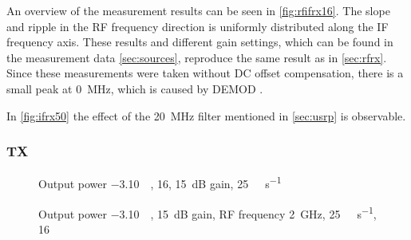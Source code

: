 \documentclass[12pt,a4paper,parskip=full,abstracton]{scrartcl}
\begin{document}
An overview of the measurement results can be seen in \cref{fig:rfifrx16}. The slope and ripple
in the RF frequency direction is uniformly distributed along the IF frequency axis.
These results and different gain settings, which can be found in the measurement data \ref{sec:sources},
reproduce the same result as in \cref{sec:rfrx}. Since these measurements were taken without DC offset
compensation, there is a small peak at \SI{0}{\mega\hertz}, which is caused by DEMOD \cite{demod}.

In \ref{fig:ifrx50} the effect of the \SI{20}{\mega\hertz} filter mentioned in \cref{sec:usrp} is
observable.

\subsubsection{TX}
\label{sec:iftx}
\begin{figure}[htb]
    \centering
{}
    \caption{Output power \SI{-3.10}{\deci\belfs}, \SI{16}{\bit}, \SI{15}{\deci\bel} gain, \SI{25}{\mega\samples\per\second}}
    \label{fig:rfiftx16}
\end{figure}
\begin{figure}[htb]
    \centering
{}
    \caption{Output power \SI{-3.10}{\deci\belfs}, \SI{15}{\deci\bel} gain, RF frequency \SI{2}{\giga\hertz}, \SI{25}{\mega\samples\per\second}, \SI{16}{\bit}}
    \label{fig:iftx}
\end{figure}
\end{document}
